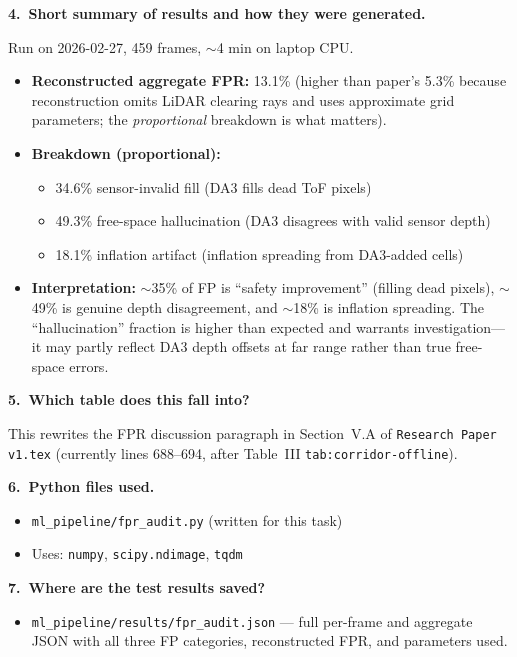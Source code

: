 \documentclass[11pt,a4paper]{article}
\begin{document}
\textbf{4.\ Short summary of results and how they were generated.}

Run on 2026-02-27, 459 frames, $\sim$4 min on laptop CPU.

\begin{itemize}[nosep]
  \item \textbf{Reconstructed aggregate FPR:} 13.1\% (higher than
    paper's 5.3\% because reconstruction omits LiDAR clearing rays
    and uses approximate grid parameters; the \emph{proportional}
    breakdown is what matters).
  \item \textbf{Breakdown (proportional):}
    \begin{itemize}[nosep]
      \item 34.6\% sensor-invalid fill (DA3 fills dead ToF pixels)
      \item 49.3\% free-space hallucination (DA3 disagrees with valid
        sensor depth)
      \item 18.1\% inflation artifact (inflation spreading from
        DA3-added cells)
    \end{itemize}
  \item \textbf{Interpretation:} $\sim$35\% of FP is ``safety
    improvement'' (filling dead pixels), $\sim$49\% is genuine
    depth disagreement, and $\sim$18\% is inflation spreading.
    The ``hallucination'' fraction is higher than expected and
    warrants investigation---it may partly reflect DA3 depth
    offsets at far range rather than true free-space errors.
\end{itemize}

\textbf{5.\ Which table does this fall into?}

This rewrites the FPR discussion paragraph in Section~V.A of
\texttt{Research Paper v1.tex} (currently lines 688--694,
after Table~III \texttt{tab:corridor-offline}).

\textbf{6.\ Python files used.}

\begin{itemize}[nosep]
  \item \texttt{ml\_pipeline/fpr\_audit.py} (written for this task)
  \item Uses: \texttt{numpy}, \texttt{scipy.ndimage}, \texttt{tqdm}
\end{itemize}

\textbf{7.\ Where are the test results saved?}

\begin{itemize}[nosep]
  \item \texttt{ml\_pipeline/results/fpr\_audit.json} --- full per-frame
    and aggregate JSON with all three FP categories, reconstructed FPR,
    and parameters used.
\end{itemize}
\end{document}

